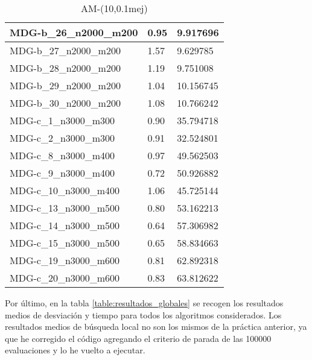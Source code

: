 \documentclass[10pt,a4paper]{article}
\begin{document}
\begin{table}[]
\begin{tabular}{|l|l|l|}
		MDG-b\_26\_n2000\_m200 & 0.95                               & 9.917696                             \\ \hline
		MDG-b\_27\_n2000\_m200 & 1.57                               & 9.629785                             \\ \hline
		MDG-b\_28\_n2000\_m200 & 1.19                               & 9.751008                             \\ \hline
		MDG-b\_29\_n2000\_m200 & 1.04                               & 10.156745                            \\ \hline
		MDG-b\_30\_n2000\_m200 & 1.08                               & 10.766242                            \\ \hline
		MDG-c\_1\_n3000\_m300  & 0.90                               & 35.794718                            \\ \hline
		MDG-c\_2\_n3000\_m300  & 0.91                               & 32.524801                            \\ \hline
		MDG-c\_8\_n3000\_m400  & 0.97                               & 49.562503                            \\ \hline
		MDG-c\_9\_n3000\_m400  & 0.72                               & 50.926882                            \\ \hline
		MDG-c\_10\_n3000\_m400 & 1.06                               & 45.725144                            \\ \hline
		MDG-c\_13\_n3000\_m500 & 0.80                               & 53.162213                            \\ \hline
		MDG-c\_14\_n3000\_m500 & 0.64                               & 57.306982                            \\ \hline
		MDG-c\_15\_n3000\_m500 & 0.65                               & 58.834663                            \\ \hline
		MDG-c\_19\_n3000\_m600 & 0.81                               & 62.892318                            \\ \hline
		MDG-c\_20\_n3000\_m600 & 0.83                               & 63.812622                            \\ \hline
	\end{tabular}
	\caption{AM-(10,0.1mej)}
	\label{table:AM3}
\end{table}

Por último, en la tabla \ref{table:resultados_globales} se recogen los resultados medios de desviación y tiempo para todos los algoritmos considerados. Los resultados medios de búsqueda local no son los mismos de la práctica anterior, ya que he corregido el código agregando el criterio de parada de las 100000 evaluaciones y lo he vuelto a ejecutar.
\end{document}

